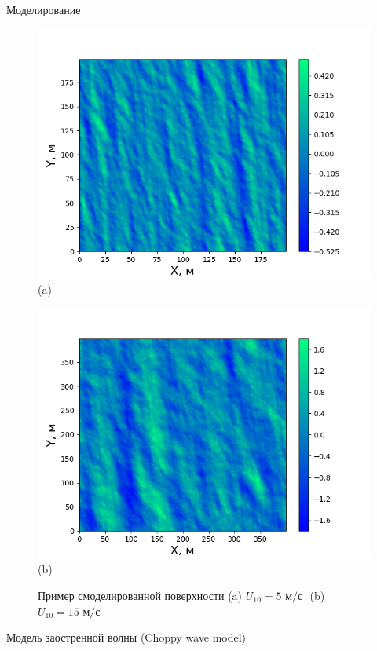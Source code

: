 \begin{frame}[t]{}
\begin{columns}[t]
\begin{column}{.48\linewidth}
\begin{block}{Моделирование}
\begin{figure}[h]
\begin{minipage}{0.45\linewidth}
                \includegraphics[width=\linewidth]{water5}
                \centering
                (a)
            \end{minipage}
            \begin{minipage}{0.45\linewidth}
                \includegraphics[width=\linewidth]{water15}
                \centering
                (b)
            \end{minipage}
            \caption{Пример смоделированной поверхности (a) $U_{10} = 5 \text{ м/с }$ (b) $U_{10} = 15 \text{ м/с}$}
        \end{figure}
        \end{block}
        \begin{block}{Модель заостренной волны (Choppy wave model)}

\end{block}
\end{column}
\end{columns}
\end{frame}

